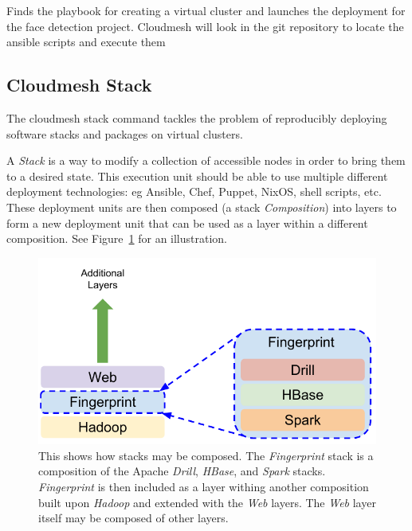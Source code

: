 Finds the playbook for creating a virtual cluster and launches the
deployment for the face detection project.  Cloudmesh will look in the
git repository to locate the ansible scripts and execute them



\subsection{Cloudmesh Stack} 
\label{S:stacks}

The cloudmesh stack command tackles the problem of reproducibly
deploying software stacks and packages on virtual clusters.

A {\it Stack} is a way to modify a collection of accessible nodes in
order to bring them to a desired state. This execution unit should be
able to use multiple different deployment technologies: eg Ansible,
Chef, Puppet, NixOS, shell scripts, etc. These deployment units are
then composed (a stack {\it Composition}) into layers to form a new
deployment unit that can be used as a layer within a different
composition. See Figure~\ref{F:stack-composition} for an illustration.


\begin{figure}
\centering
\includegraphics[width=1\columnwidth]{images/cloudmesh-stack-composition.pdf}
\caption{This shows how stacks may be composed. The
  {\it Fingerprint} stack is a composition of the Apache
  {\it Drill}, {\it HBase}, and {\it Spark}
  stacks. {\it Fingerprint} is then included as a layer withing
  another composition built upon {\it Hadoop} and extended with the
  {\it Web} layers. The {\it Web} layer itself may be composed
  of other layers.
  \label{F:stack-composition}}
\end{figure}


